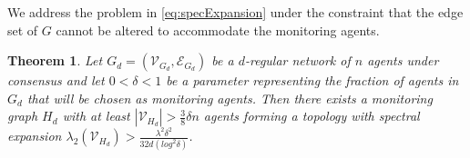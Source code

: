 \documentclass[reqno,8pt]{amsart}
\newtheorem{theorem}{Theorem}
\theoremstyle{definition}
\theoremstyle{remark}
\numberwithin{equation}{section}
\def\cV{\mathcal{V}}
\def\cE{\mathcal{E}}
\begin{document}
 We address the problem in \ref{eq:specExpansion} under the constraint that the edge set of $G$ cannot be altered to accommodate the monitoring agents. 
\begin{theorem} \label{thrm:existenceOfH}
Let $G_d=(\cV_{G_d}, \cE_{G_d})$ be a $d$-regular network of $n$ agents under consensus and let $0<\delta <1$ be a parameter representing the fraction of agents in $G_d$ that will be chosen as monitoring agents. Then there exists a monitoring graph $H_d$ with at least $|\cV_{H_d}| > \frac{3}{8} \delta n$ agents forming a topology with spectral expansion $\lambda_2 (\cV_{H_d}) > \frac{\lambda^2 \delta^2}{32d(log^2 \delta)}$.

\end{theorem}
\end{document}
